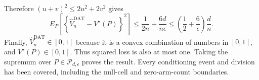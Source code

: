 Therefore \((u+v)^2\le2u^2+2v^2\) gives
\[
 E_P\!\left[
  \left\{\widehat V_n^{\mathrm{DAT}}-V^\star(P)\right\}^2
 \right]
 \le \frac1{2n}+\frac{6d}{n\epsilon}
 \le \left(\frac12+\frac6\epsilon\right)\frac dn.
\]
Finally, \(\widehat V_n^{\mathrm{DAT}}\in[0,1]\) because it is a convex combination of numbers in \([0,1]\), and \(V^\star(P)\in[0,1]\).  Thus squared loss is also at most one.  Taking the supremum over \(P\in\mathcal P_{d,\epsilon}\) proves the result.  Every conditioning event and division has been covered, including the null-cell and zero-arm-count boundaries.